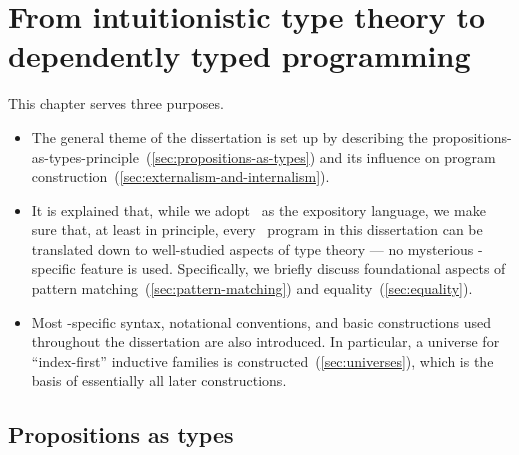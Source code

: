 \chapter{From intuitionistic type theory to dependently typed programming}
\label{chap:background}

This chapter serves three purposes.
\begin{itemize}
\item The general theme of the dissertation is set up by describing the propositions-as-types-principle~(\autoref{sec:propositions-as-types}) and its influence on program construction~(\autoref{sec:externalism-and-internalism}).
\item It is explained that, while we adopt \Agda\ as the expository language, we make sure that, at least in principle, every \Agda\ program in this dissertation can be translated down to well-studied aspects of type theory --- no mysterious \Agda-specific feature is used.
Specifically, we briefly discuss foundational aspects of pattern matching~(\autoref{sec:pattern-matching}) and equality~(\autoref{sec:equality}).
\item Most \Agda-specific syntax, notational conventions, and basic constructions used throughout the dissertation are also introduced.
In particular, a universe for ``index-first'' inductive families is constructed~(\autoref{sec:universes}), which is the basis of essentially all later constructions.
\end{itemize}


\section{Propositions as types}
\label{sec:propositions-as-types}

